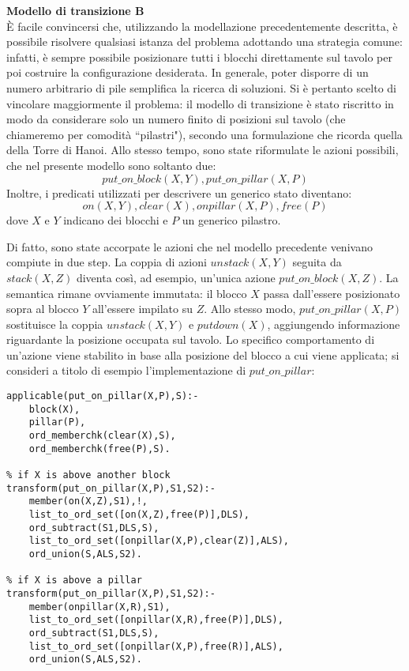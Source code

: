 \noindent\textbf{Modello di transizione B}\\
È facile convincersi che, utilizzando la modellazione precedentemente descritta, è possibile risolvere qualsiasi istanza del problema adottando una strategia comune: infatti, è sempre possibile posizionare tutti i blocchi direttamente sul tavolo per poi costruire la configurazione desiderata. In generale, poter disporre di un numero arbitrario di pile semplifica la ricerca di soluzioni.
Si è pertanto scelto di vincolare maggiormente il problema: il modello di transizione è stato riscritto in modo da considerare solo un numero finito di posizioni sul tavolo (che chiameremo per comodità ``pilastri"), secondo una formulazione che ricorda quella della Torre di Hanoi. Allo stesso tempo, sono state riformulate le azioni possibili, che nel presente modello sono soltanto due:
\[ put\_on\_block(X,Y),put\_on\_pillar(X,P)\]
Inoltre, i predicati utilizzati per descrivere un generico stato diventano:
\[ on(X,Y),clear(X),onpillar(X,P),free(P) \]
dove $X$ e $Y$ indicano dei blocchi e $P$ un generico pilastro.

Di fatto, sono state accorpate le azioni che nel modello precedente venivano compiute in due step. La coppia di azioni $unstack(X,Y)$ seguita da $stack(X,Z)$ diventa così, ad esempio, un'unica azione $put\_on\_block(X,Z)$. La semantica rimane ovviamente immutata: il blocco $X$ passa dall'essere posizionato sopra al blocco $Y$ all'essere impilato su $Z$.
Allo stesso modo, $put\_on\_pillar(X,P)$ sostituisce la coppia $unstack(X,Y)$ e $putdown(X)$, aggiungendo informazione riguardante la posizione occupata sul tavolo.
Lo specifico comportamento di un'azione viene stabilito in base alla posizione del blocco a cui viene applicata; si consideri a titolo di esempio l'implementazione di $put\_on\_pillar$:
\lstset{numbers=left,breaklines=true,language=Prolog,basicstyle=\small\ttfamily}
\begin{lstlisting}[frame=single]
applicable(put_on_pillar(X,P),S):-
	block(X),
	pillar(P),
	ord_memberchk(clear(X),S),
	ord_memberchk(free(P),S).

% if X is above another block
transform(put_on_pillar(X,P),S1,S2):-
	member(on(X,Z),S1),!,
	list_to_ord_set([on(X,Z),free(P)],DLS),
	ord_subtract(S1,DLS,S),
	list_to_ord_set([onpillar(X,P),clear(Z)],ALS),
	ord_union(S,ALS,S2).

% if X is above a pillar
transform(put_on_pillar(X,P),S1,S2):-
	member(onpillar(X,R),S1),
	list_to_ord_set([onpillar(X,R),free(P)],DLS),
	ord_subtract(S1,DLS,S),
	list_to_ord_set([onpillar(X,P),free(R)],ALS),
	ord_union(S,ALS,S2).
\end{lstlisting}

